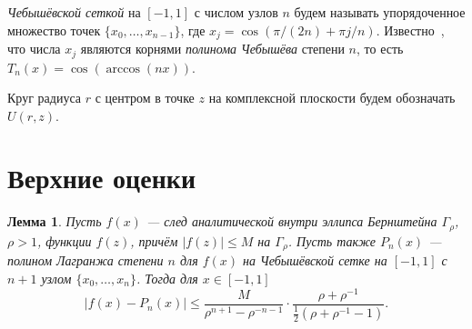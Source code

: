 \documentclass[3p]{cmmp}%
\newtheorem{lemma}{Лемма}
\numberwithin{equation}{section}
\begin{document}
\emph{Чебышёвской сеткой} на $[-1,1]$ с числом узлов $n$ будем называть упорядоченное множество точек $\{x_0, \dots, x_{n-1}\}$, где $x_j = \cos(\pi/(2n) + \pi j/n)$.
Известно~\cite{MNA}, что числа $x_j$ являются корнями \emph{полинома Чебышёва} степени $n$, то есть $T_n(x) = \cos(\arccos (nx))$.


Круг радиуса $r$ с центром в точке $z$ на комплексной плоскости будем обозначать $U(r, z)$.

\section{Верхние оценки}
\begin{lemma}\label{lm:lagrange}
	Пусть $f(x)$ --- след аналитической внутри эллипса Бернштейна $\Gamma_{\rho}$, $\rho > 1$,  функции $f(z)$, причём $|f(z)| \leq M$  на $\Gamma_{\rho}$.
	Пусть также $P_n(x)$ --- полином Лагранжа степени $n$ для $f(x)$ на Чебышёвской сетке на $[-1,1]$ с $n + 1$ узлом $\{x_0, \dots, x_n\}$.  
	Тогда для $x \in [-1,1]$
	\[|f(x)-P_n(x)| \leq \frac{M}{\rho^{n+1}-\rho^{-n-1}}\cdot \frac{\rho + \rho^{-1}}{\frac{1}{2}(\rho + \rho^{-1}-1 )}.\]
\end{lemma}
\end{document}
